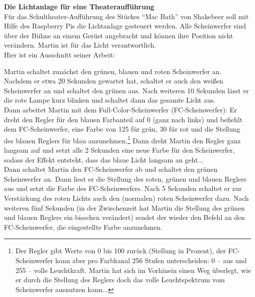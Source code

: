 \documentclass[11pt, a4paper]{article}
\begin{document}
\textbf{{\Large Die Lichtanlage für eine Theateraufführung}}\\

Für das Schultheater-Aufführung des Stückes \enquote{Mac Bath} von Shakebeer soll mit Hilfe des Raspberry Pis die Lichtanlage gesteuert werden. Alle Scheinwerfer sind über der Bühne an einem Gerüst angebracht und können ihre Position nicht verändern. Martin ist für das Licht verantwortlich. \\

Hier ist ein Ausschnitt seiner Arbeit:
\begin{mdframed}

Martin schaltet zunächst den grünen, blauen und roten Scheinwerfer an. Nachdem er etwa 20 Sekunden gewartet hat, schaltet er auch den weißen Scheinwerfer an und schaltet den grünen aus. Nach weiteren 10 Sekunden lässt er die rote Lampe kurz blinken und schaltet dann das gesamte Licht aus.\\

Dann arbeitet Martin mit dem Full-Color-Scheinwerfer (FC-Scheinwerfer): Er dreht den Regler für den blauen Farbanteil auf 0 (ganz nach links) und befiehlt dem FC-Scheinwerfer, eine Farbe von 125 für grün, 30 für rot und die Stellung des blauen Reglers für blau anzunehmen.\footnote{Der Regler gibt Werte von 0 bis 100 zurück (Stellung in Prozent), der FC-Scheinwerfer kann aber pro Farbkanal 256 Stufen unterscheiden: 0 -- aus und 255 -- volle Leuchtkraft. Martin hat sich im Vorhinein einen Weg überlegt, wie er durch die Stellung des Reglers doch das volle Leuchtspektrum vom Scheinwerfer ausnutzen kann...} Dann dreht Martin den Regler ganz langsam auf und setzt alle 2 Sekunden eine neue Farbe für den Scheinwerfer, sodass der Effekt entsteht, dass das blaue Licht langsam an geht...\\

Dann schaltet Martin den FC-Scheinwerfer ab und schaltet den grünen Scheinwerfer an. Dann liest er die Stellung des roten, grünen und blauen Reglers aus und setzt die Farbe des FC-Scheinwerfers. Nach 5 Sekunden schaltet er zur Verstärkung des roten Lichts auch den (normalen) roten Scheinwerfer dazu. Nach weiteren fünf Sekunden (in der Zwischenzeit hat Martin die Stellung des grünen und blauen Reglers ein bisschen verändert) sendet der wieder den Befehl an den FC-Scheinwerfer, die eingestellte Farbe anzunehmen.\\


\end{mdframed}
\end{document}
